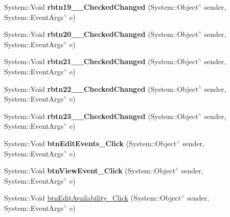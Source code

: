 \begin{DoxyCompactItemize}
\item 
\mbox{\label{class_project1_1_1_my_form_ac2935e91e04de63ec8bfb7db6aaecb47}} 
System\+::\+Void {\bfseries rbtn19\+\_\+\_\+\+Checked\+Changed} (System\+::\+Object$^\wedge$ sender, System\+::\+Event\+Args$^\wedge$ e)
\item 
\mbox{\label{class_project1_1_1_my_form_a50893c5ba762edfe9ea01d9cf7ce0373}} 
System\+::\+Void {\bfseries rbtn20\+\_\+\_\+\+Checked\+Changed} (System\+::\+Object$^\wedge$ sender, System\+::\+Event\+Args$^\wedge$ e)
\item 
\mbox{\label{class_project1_1_1_my_form_a481cb9ee54f696cf1dbc7e56f57fff1d}} 
System\+::\+Void {\bfseries rbtn21\+\_\+\_\+\+Checked\+Changed} (System\+::\+Object$^\wedge$ sender, System\+::\+Event\+Args$^\wedge$ e)
\item 
\mbox{\label{class_project1_1_1_my_form_a8473fcc7ddc01fe6cdba0c6557bf0034}} 
System\+::\+Void {\bfseries rbtn22\+\_\+\_\+\+Checked\+Changed} (System\+::\+Object$^\wedge$ sender, System\+::\+Event\+Args$^\wedge$ e)
\item 
\mbox{\label{class_project1_1_1_my_form_a7dfa1e7aa60e67207066b656420bc6f9}} 
System\+::\+Void {\bfseries rbtn23\+\_\+\_\+\+Checked\+Changed} (System\+::\+Object$^\wedge$ sender, System\+::\+Event\+Args$^\wedge$ e)
\item 
\mbox{\label{class_project1_1_1_my_form_aff0939fedbe7b55f9764b6289f8c283f}} 
System\+::\+Void {\bfseries btn\+Edit\+Events\+\_\+\+Click} (System\+::\+Object$^\wedge$ sender, System\+::\+Event\+Args$^\wedge$ e)
\item 
\mbox{\label{class_project1_1_1_my_form_a1b4c7bdc3fe2c45d6bb1d36f0c2a3abd}} 
System\+::\+Void {\bfseries btn\+View\+Event\+\_\+\+Click} (System\+::\+Object$^\wedge$ sender, System\+::\+Event\+Args$^\wedge$ e)
\item 
System\+::\+Void \mbox{\hyperlink{class_project1_1_1_my_form_a79628116884cb1697023736fa5239e14}{btn\+Edit\+Availability\+\_\+\+Click}} (System\+::\+Object$^\wedge$ sender, System\+::\+Event\+Args$^\wedge$ e)

\end{DoxyCompactItemize}
